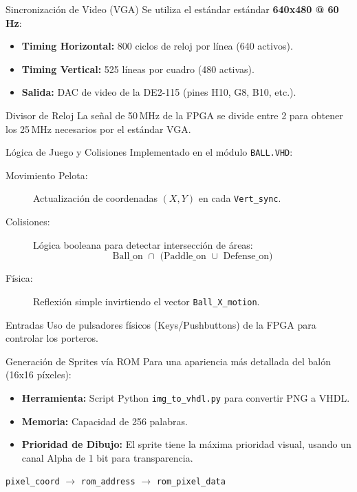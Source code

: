 \documentclass[10pt, spanish]{beamer}
\begin{document}
\begin{frame}{Sincronización de Video (VGA)}
    Se utiliza el estándar estándar \textbf{640x480 @ 60\,Hz}:
    \begin{itemize}
        \item \textbf{Timing Horizontal:} 800 ciclos de reloj por línea (640 activos).
        \item \textbf{Timing Vertical:} 525 líneas por cuadro (480 activas).
        \item \textbf{Salida:} DAC de video de la DE2-115 (pines H10, G8, B10, etc.).
    \end{itemize}
    \vfill
    \begin{block}{Divisor de Reloj}
        La señal de 50\,MHz de la FPGA se divide entre 2 para obtener los 25\,MHz necesarios por el estándar VGA.
    \end{block}
\end{frame}

\begin{frame}{Lógica de Juego y Colisiones}
    Implementado en el módulo \texttt{BALL.VHD}:
    \begin{description}
        \item[Movimiento Pelota:] Actualización de coordenadas $(X, Y)$ en cada \texttt{Vert\_sync}.
        \item[Colisiones:] Lógica booleana para detectar intersección de áreas:
            \[ \text{Ball\_on } \cap \text{ (Paddle\_on } \cup \text{ Defense\_on)} \]
        \item[Física:] Reflexión simple invirtiendo el vector \texttt{Ball\_X\_motion}.
    \end{description}
    \vfill
    \begin{exampleblock}{Entradas}
        Uso de pulsadores físicos (Keys/Pushbuttons) de la FPGA para controlar los porteros.
    \end{exampleblock}
\end{frame}

\begin{frame}{Generación de Sprites vía ROM}
    Para una apariencia más detallada del balón (16x16 píxeles):
    \begin{itemize}
        \item \textbf{Herramienta:} Script Python \texttt{img\_to\_vhdl.py} para convertir PNG a VHDL.
        \item \textbf{Memoria:} Capacidad de 256 palabras.
        \item \textbf{Prioridad de Dibujo:} El sprite tiene la máxima prioridad visual, usando un canal Alpha de 1 bit para transparencia.
    \end{itemize}
    \begin{center}
        \texttt{pixel\_coord} $\rightarrow$ \texttt{rom\_address} $\rightarrow$ \texttt{rom\_pixel\_data}
    \end{center}
\end{frame}
\end{document}

